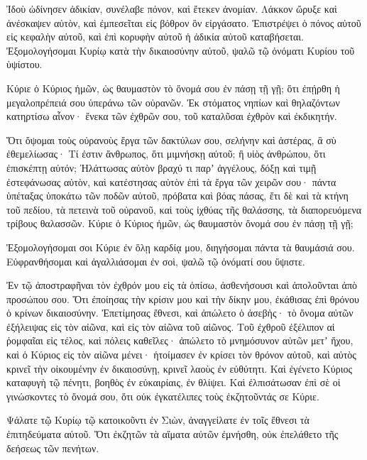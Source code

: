 \begin{spacing}{1.1}
\begin{multicols}{2}
Ἰδοὺ ὠδίνησεν ἀδικίαν, συνέλαβε πόνον, καὶ ἔτεκεν ἀνομίαν.
Λάκκον ὤρυξε καὶ ἀνέσκαψεν αὐτὸν, καὶ ἐμπεσεῖται εἰς βόθρον ὃν εἰργάσατο.
Ἐπιστρέψει ὁ πόνος αὐτοῦ εἰς κεφαλὴν αὐτοῦ, καὶ ἐπὶ κορυφὴν αὐτοῦ ἡ ἀδικία αὐτοῦ καταβήσεται.
Ἐξομολογήσομαι Κυρίῳ κατὰ τὴν δικαιοσύνην αὐτοῦ, ψαλῶ τῷ ὀνόματι Κυρίου τοῦ ὑψίστου.

Κύριε ὁ Κύριος ἡμῶν, ὡς θαυμαστὸν τὸ ὄνομά σου ἐν πάσῃ τῇ γῇ; ὅτι ἐπῄρθη ἡ μεγαλοπρέπειά σου ὑπεράνω τῶν οὐρανῶν.
Ἐκ στόματος νηπίων καὶ θηλαζόντων κατηρτίσω αἶνον· ἕνεκα τῶν ἐχθρῶν σου, τοῦ καταλῦσαι ἐχθρὸν καὶ ἐκδικητήν.

Ὅτι ὄψομαι τοὺς οὐρανοὺς ἔργα τῶν δακτύλων σου, σελήνην καὶ ἀστέρας, ἃ σὺ ἐθεμελίωσας·
Τί ἐστιν ἄνθρωπος, ὅτι μιμνήσκῃ αὐτοῦ; ἢ υἱὸς ἀνθρώπου, ὅτι ἐπισκέπτῃ αὐτόν;
Ἠλάττωσας αὐτὸν βραχύ τι παρʼ ἀγγέλους, δόξῃ καὶ τιμῇ ἐστεφάνωσας αὐτὸν,
καὶ κατέστησας αὐτὸν ἐπὶ τὰ ἔργα τῶν χειρῶν σου· πάντα ὑπέταξας ὑποκάτω τῶν ποδῶν αὐτοῦ,
πρόβατα καὶ βόας πάσας, ἔτι δὲ καὶ τὰ κτήνη τοῦ πεδίου,
τὰ πετεινὰ τοῦ οὐρανοῦ, καὶ τοὺς ἰχθύας τῆς θαλάσσης, τὰ διαπορευόμενα τρίβους θαλασσῶν.
Κύριε ὁ Κύριος ἡμῶν, ὡς θαυμαστὸν ὄνομά σου ἐν πάσῃ τῇ γῇ;

Ἐξομολογήσομαι σοι Κύριε ἐν ὅλῃ καρδίᾳ μου, διηγήσομαι πάντα τὰ θαυμάσιά σου.
Εὐφρανθήσομαι καὶ ἀγαλλιάσομαι ἐν σοὶ, ψαλῶ τῷ ὀνόματί σου ὕψιστε.

Ἐν τῷ ἀποστραφῆναι τὸν ἐχθρόν μου εἰς τὰ ὀπίσω, ἀσθενήσουσι καὶ ἀπολοῦνται ἀπὸ προσώπου σου.
Ὅτι ἐποίησας τὴν κρίσιν μου καὶ τὴν δίκην μου, ἐκάθισας ἐπὶ θρόνου ὁ κρίνων δικαιοσύνην.
Ἐπετίμησας ἔθνεσι, καὶ ἀπώλετο ὁ ἀσεβὴς· τὸ ὄνομα αὐτῶν ἐξήλειψας εἰς τὸν αἰῶνα, καὶ εἰς τὸν αἰῶνα τοῦ αἰῶνος.
Τοῦ ἐχθροῦ ἐξέλιπον αἱ ῥομφαῖαι εἰς τέλος, καὶ πόλεις καθεῖλες· ἀπώλετο τὸ μνημόσυνον αὐτῶν μετʼ ἤχου,
καὶ ὁ Κύριος εἰς τὸν αἰῶνα μένει· ἡτοίμασεν ἐν κρίσει τὸν θρόνον αὐτοῦ,
καὶ αὐτὸς κρινεῖ τὴν οἰκουμένην ἐν δικαιοσύνῃ, κρινεῖ λαοὺς ἐν εὐθύτητι.
Καὶ ἐγένετο Κύριος καταφυγὴ τῷ πένητι, βοηθὸς ἐν εὐκαιρίαις, ἐν θλίψει.
Καὶ ἐλπισάτωσαν ἐπὶ σὲ οἱ γινώσκοντες τὸ ὄνομά σου, ὅτι οὐκ ἐγκατέλιπες τοὺς ἐκζητοῦντάς σε Κύριε.

Ψάλατε τῷ Κυρίῳ τῷ κατοικοῦντι ἐν Σιὼν, ἀναγγείλατε ἐν τοῖς ἔθνεσι τὰ ἐπιτηδεύματα αὐτοῦ.
Ὅτι ἐκζητῶν τὰ αἵματα αὐτῶν ἐμνήσθη, οὐκ ἐπελάθετο τῆς δεήσεως τῶν πενήτων.


\end{multicols}
\end{spacing}
